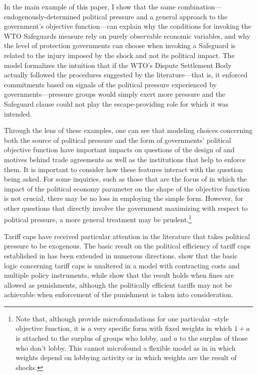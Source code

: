 In the main example of this paper, I show that the same combination---endogenously-determined political pressure and a general approach to the government's objective function---can explain why the conditions for invoking the WTO Safeguards measure rely on purely observable economic variables, and why the level of protection governments can choose when invoking a Safeguard is related to the injury imposed by the shock and not its political impact. The model formalizes the intuition that if the WTO's Dispute Settlement Body actually followed the procedures suggested by the literature---that is, it enforced commitments based on signals of the political pressure experienced by governments---pressure groups would simply exert more pressure and the Safeguard clause could not play the escape-providing role for which it was intended.

Through the lens of these examples, one can see that modeling choices concerning both the source of political pressure and the form of governments' political objective function have important impacts on questions of the design of and motives behind trade agreements as well as the institutions that help to enforce them. It is important to consider how these features interact with the question being asked. For some inquiries, such as those that are the focus of \Textcite{ms2011, ms2012a} in which the impact of the political economy parameter on the shape of the objective function is not crucial, there may be no loss in employing the simple form. However, for other questions that directly involve the government maximizing with respect to political pressure, a more general treatment may be prudent.\footnote{Note that, although \Textcite{gh94} provide microfoundations for one particular \Textcite{baldwin}-style objective function, it is a very specific form with fixed weights in which $1+a$ is attached to the surplus of groups who lobby, and $a$ to the surplus of those who don't lobby. This cannot microfound a flexible model as in \Textcite{longvousden} in which weights depend on lobbying activity or in which weights are the result of shocks.}





Tariff caps have received particular attention in the literature that takes political pressure to be exogenous. The basic result on the political efficiency of tariff caps established in \Textcite{bs2005} has been extended in numerous directions. \Textcite{hms} show that the basic logic concerning tariff caps is unaltered in a model with contracting costs and multiple policy instruments, while \Textcite{ls} show that the result holds when fines are allowed as punishments, although the politically efficient tariffs may not be achievable when enforcement of the punishment is taken into consideration. 

